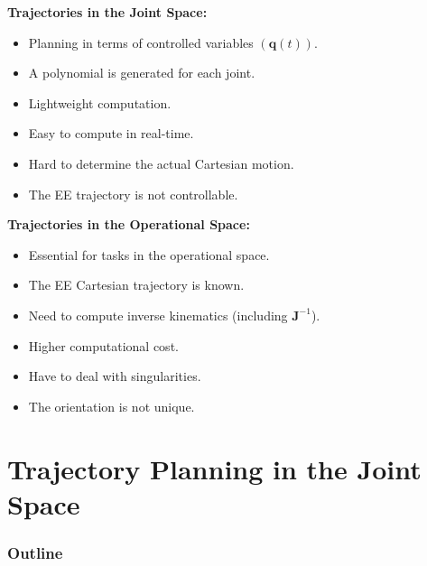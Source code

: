 \documentclass[10pt, aspectratio=169]{beamer}
\theoremstyle{remark}
\theoremstyle{definition}
\begin{document}
\begin{frame}[allowframebreaks]
    \begin{center}
    \begin{minipage}[t]{.5\linewidth}
        \textbf{\textcolor{uma_blue_dark}{Trajectories in the Joint Space:}}
        \begin{itemize}
            \item Planning in terms of controlled variables $(\mathbf{q}(t))$.
            \item A polynomial is generated for each joint.
            \item Lightweight computation.
            \item Easy to compute in real-time.
            \item Hard to determine the actual Cartesian motion.
            \item The EE trajectory is not controllable.
        \end{itemize}
    \end{minipage}
    \begin{minipage}[t]{.49\linewidth}
        \textbf{\textcolor{uma_blue_dark}{Trajectories in the Operational Space:}}
        \begin{itemize}
            \item Essential for tasks in the operational space.
            \item The EE Cartesian trajectory is known.
            \item Need to compute inverse kinematics (including $\mathbf{J}^{-1}$).
            \item Higher computational cost.
            \item Have to deal with singularities.
            \item The orientation is not unique.
            
        \end{itemize}
    \end{minipage}
    \end{center}

  
\end{frame}

\section{Trajectory Planning in the Joint Space}
\begin{frame}
	\frametitle{Outline} %
	\tableofcontents[currentsection] %
\end{frame}
\end{document}
